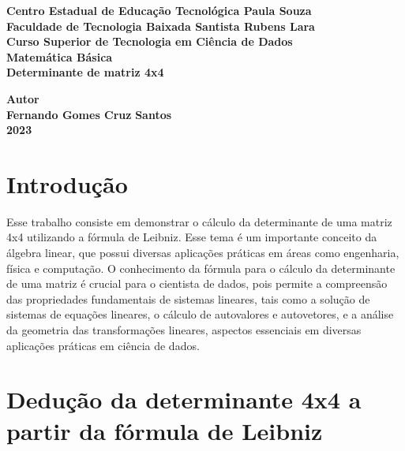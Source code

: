 \documentclass[12pt, a4paper]{article}
\begin{document}
\begin{titlepage}
\begin{center}
    \large
     {\bf Centro Estadual de Educação Tecnológica Paula Souza} \\
     {\bf Faculdade de Tecnologia Baixada Santista
Rubens Lara} \\ 
    {\bf Curso Superior de Tecnologia em Ciência de Dados} \\
    
    \vspace{215pt}
        {\bf Matemática Básica} \\
    \vspace{10pt}
        {\Large \bf Determinante de matriz 4x4}\\
        
    \vspace{100pt}

    \vfill
        {\large  \bf Autor} \\
        {\large  \bf Fernando Gomes Cruz} 
    \vfill
        \textbf{{\large Santos}\\
        {\large 2023}}
        
\end{center}
\end{titlepage}

\tableofcontents

\newpage

\section{Introdução}

Esse trabalho consiste em demonstrar o cálculo da determinante de uma matriz 4x4 utilizando a fórmula de Leibniz. Esse tema é um importante conceito da álgebra linear, que possui diversas aplicações práticas em áreas como engenharia, física e computação. O conhecimento da fórmula para o cálculo da determinante de uma matriz é crucial para o cientista de dados, pois permite a compreensão das propriedades fundamentais de sistemas lineares, tais como a solução de sistemas de equações lineares, o cálculo de autovalores e autovetores, e a análise da geometria das transformações lineares, aspectos essenciais em diversas aplicações práticas em ciência de dados. 
\section{Dedução da determinante 4x4 a partir da fórmula de Leibniz}
\end{document}
